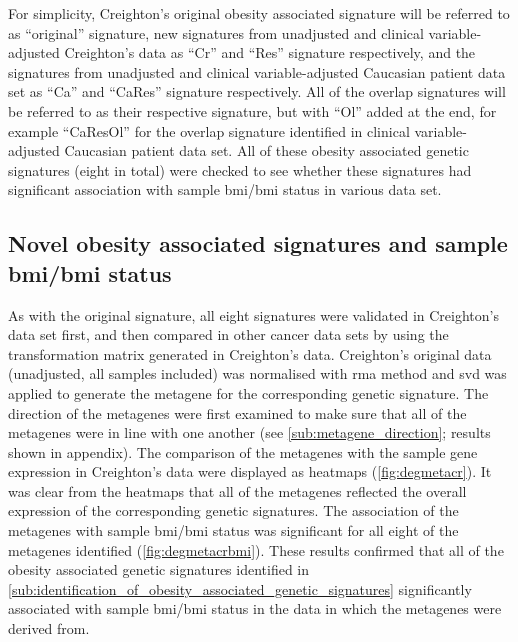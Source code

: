 For simplicity, Creighton's original obesity associated signature will be referred to as ``original'' signature, new signatures from unadjusted and clinical variable-adjusted Creighton's data as ``Cr'' and ``Res'' signature respectively, and the signatures from unadjusted and clinical variable-adjusted Caucasian patient data set as ``Ca'' and ``CaRes'' signature respectively.
All of the overlap signatures will be referred to as their respective signature, but with ``Ol'' added at the end, for example ``CaResOl'' for the overlap signature identified in clinical variable-adjusted Caucasian patient data set.
All of these obesity associated genetic signatures (eight in total) were checked to see whether these signatures had significant association with sample \gls{bmi}/\gls{bmi} status in various data set.

\subsection{Novel obesity associated signatures and sample \gls{bmi}/\gls{bmi} status}
\label{sub:_novel_obesity_associated_signatures_and_sample_bmi}

As with the original signature, all eight signatures were validated in Creighton's data set first, and then compared in other cancer data sets by using the transformation matrix generated in Creighton's data.
Creighton's original data (unadjusted, all samples included) was normalised with \gls{rma} method and \gls{svd} was applied to generate the metagene for the corresponding genetic signature.
The direction of the metagenes were first examined to make sure that all of the metagenes were in line with one another (see \cref{sub:metagene_direction}; results shown in appendix).
The comparison of the metagenes with the sample gene expression in Creighton's data were displayed as heatmaps (\cref{fig:degmetacr}).
It was clear from the heatmaps that all of the metagenes reflected the overall expression of the corresponding genetic signatures.
The association of the metagenes with sample \gls{bmi}/\gls{bmi} status was significant for all eight of the metagenes identified (\cref{fig:degmetacrbmi}).
These results confirmed that all of the obesity associated genetic signatures identified in \cref{sub:identification_of_obesity_associated_genetic_signatures} significantly associated with sample \gls{bmi}/\gls{bmi} status in the data in which the metagenes were derived from.

